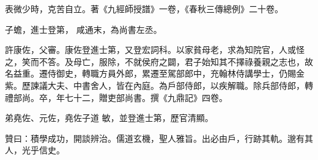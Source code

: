 \begin{pinyinscope}
 表微少時，克苦自立。著《九經師授譜》一卷，《春秋三傳總例》二十卷。



 子蟾，進士登第，
 咸通末，為尚書左丞。



 許康佐，父審。康佐登進士第，又登宏詞科。以家貧母老，求為知院官，人或怪之，笑而不答。及母亡，服除，不就侯府之闢，君子始知其不擇祿養親之志也，故名益重。遷侍御史，轉職方員外郎，累遷至駕部郎中，充翰林侍講學士，仍賜金紫。歷諫議大夫、中書舍人，皆在內庭。為戶部侍郎，以疾解職。除兵部侍郎，轉禮部尚。卒，年七十二，贈吏部尚書。撰《九鼎記》四卷。



 弟堯佐、元佐，堯佐子道
 敏，並登進士第，歷官清顯。



 贊曰：積學成功，開談辨治。儒道玄機，聖人雅旨。出必由戶，行跡其軌。邈有其人，光乎信史。



\end{pinyinscope}